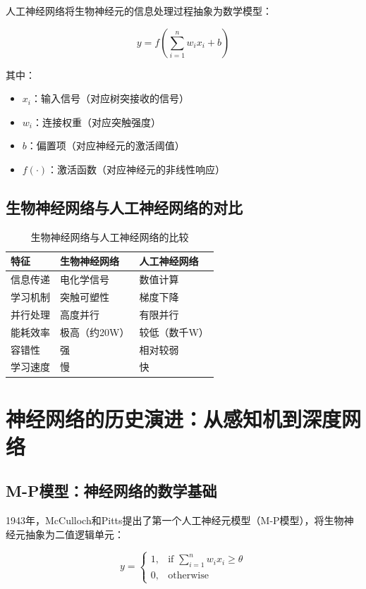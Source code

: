 人工神经网络将生物神经元的信息处理过程抽象为数学模型：

\begin{equation}
y = f\left(\sum_{i=1}^{n} w_i x_i + b\right)
\end{equation}

其中：
\begin{itemize}
\item $x_i$：输入信号（对应树突接收的信号）
\item $w_i$：连接权重（对应突触强度）
\item $b$：偏置项（对应神经元的激活阈值）
\item $f(\cdot)$：激活函数（对应神经元的非线性响应）
\end{itemize}

\subsection{生物神经网络与人工神经网络的对比}

\begin{table}[htbp]
\centering
\caption{生物神经网络与人工神经网络的比较}
\begin{tabular}{|l|l|l|}
\hline
{\bf 特征} & {\bf 生物神经网络} & {\bf 人工神经网络} \\
\hline
信息传递 & 电化学信号 & 数值计算 \\
\hline
学习机制 & 突触可塑性 & 梯度下降 \\
\hline
并行处理 & 高度并行 & 有限并行 \\
\hline
能耗效率 & 极高（约20W） & 较低（数千W） \\
\hline
容错性 & 强 & 相对较弱 \\
\hline
学习速度 & 慢 & 快 \\
\hline
\end{tabular}
\end{table}

\section{神经网络的历史演进：从感知机到深度网络}

\subsection{M-P模型：神经网络的数学基础}

1943年，McCulloch和Pitts提出了第一个人工神经元模型（M-P模型），将生物神经元抽象为二值逻辑单元：

\begin{equation}
y = \begin{cases}
1, & \text{if } \sum_{i=1}^{n} w_i x_i \geq \theta \\
0, & \text{otherwise}
\end{cases}
\end{equation}

